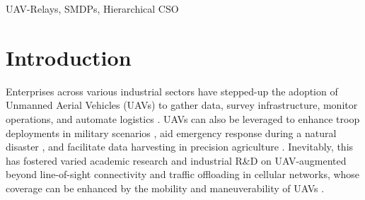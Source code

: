 \documentclass[10pt, twocolumn]{IEEEtran}
\theoremstyle{plain}
\theoremstyle{definition}
\theoremstyle{remark}
\begin{document}
\begin{IEEEkeywords}
UAV-Relays, SMDPs, Hierarchical CSO
\end{IEEEkeywords}

\section{Introduction}\label{S1}
Enterprises across various industrial sectors have stepped-up the adoption of Unmanned Aerial Vehicles (UAVs) to gather data, survey infrastructure, monitor operations, and automate logistics \cite{UAVSurvey, UAVTutorial}.
UAVs can also be leveraged to enhance troop deployments in military scenarios \cite{TCCN}, aid emergency response during a natural disaster \cite{VerizonDisasterRelief}, and facilitate data harvesting in precision agriculture \cite{VerizonAgriculture}. Inevitably, this has fostered varied academic research and industrial R\&D on UAV-augmented beyond line-of-sight connectivity and traffic offloading in cellular networks, whose coverage can be enhanced by the mobility and maneuverability of UAVs \cite{LOSDominance, FundamentalTradeoffs}. 
\end{document}

